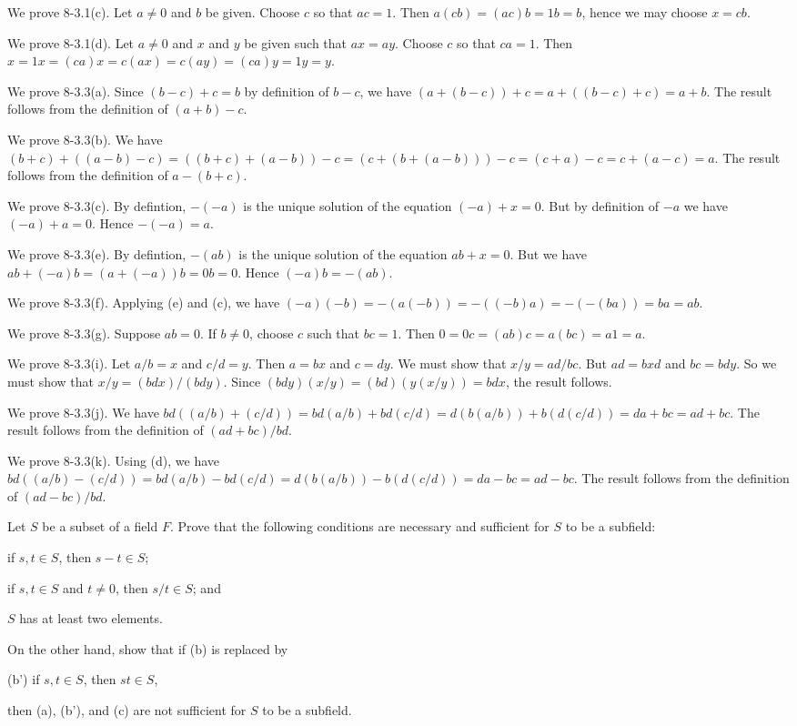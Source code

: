 \begin{solution}
We prove 8-3.1(c). Let $a\neq 0$ and $b$ be given. Choose $c$ so that $ac=1$. Then
$a(cb)=(ac)b=1b=b$, hence we may choose $x=cb$.

We prove 8-3.1(d). Let $a\neq 0$ and $x$ and $y$ be given such that $ax=ay$.
Choose $c$ so that $ca=1$. Then $x=1x=(ca)x=c(ax)=c(ay)=(ca)y=1y=y$.

We prove 8-3.3(a). Since $(b-c)+c=b$ by definition of $b-c$, we have $(a+(b-c))+c=a+((b-c)+c)=a+b$.
The result follows from the definition of $(a+b)-c$.

We prove 8-3.3(b). We have $(b+c)+((a-b)-c)=((b+c)+(a-b))-c=(c+(b+(a-b)))-c=(c+a)-c=c+(a-c)=a$.
The result follows from the definition of $a-(b+c)$.

We prove 8-3.3(c). By defintion, $-(-a)$ is the unique solution of the equation $(-a)+x=0$.
But by definition of $-a$ we have $(-a)+a=0$. Hence $-(-a)=a$.

We prove 8-3.3(e). By defintion, $-(ab)$ is the unique solution of the equation $ab+x=0$.
But we have $ab+(-a)b=(a+(-a))b=0b=0$. Hence $(-a)b=-(ab)$.

We prove 8-3.3(f). Applying (e) and (c), we have $(-a)(-b)=-(a(-b))=-((-b)a)=-(-(ba))=ba=ab$.

We prove 8-3.3(g). Suppose $ab=0$. If $b\neq 0$, choose $c$ such that $bc=1$.
Then $0=0c=(ab)c=a(bc)=a1=a$.

We prove 8-3.3(i).  Let $a/b=x$ and $c/d=y$. Then $a=bx$ and $c=dy$. We must show that $x/y=ad/bc$.
But $ad=bxd$ and $bc=bdy$. So we must show that $x/y=(bdx)/(bdy)$.
Since $(bdy)(x/y)=(bd)(y(x/y))=bdx$, the result follows.

We prove 8-3.3(j). We have $bd((a/b)+(c/d))=bd(a/b)+bd(c/d)=d(b(a/b))+b(d(c/d))=da+bc=ad+bc$.
The result follows from the definition of $(ad+bc)/bd$.

We prove 8-3.3(k). Using (d), we have $bd((a/b)-(c/d))=bd(a/b)-bd(c/d)=d(b(a/b))-b(d(c/d))=da-bc=ad-bc$.
The result follows from the definition of $(ad-bc)/bd$.
\end{solution}

\begin{exercise}
Let $S$ be a subset of a field $F$. Prove that the following conditions are necessary and
sufficient for $S$ to be a subfield:
\begin{enumalpha}
    \item if $s,t\in S$, then $s-t\in S$;
    \item if $s,t\in S$ and $t\neq0$, then $s/t\in S$; and
    \item $S$ has at least two elements.
\end{enumalpha}
On the other hand, show that if (b) is replaced by
\begin{enumalpha}
    \item[(b')] if $s,t\in S$, then $st\in S$,
\end{enumalpha}
then (a), (b'), and (c) are not sufficient for $S$ to be a subfield.
\end{exercise}

